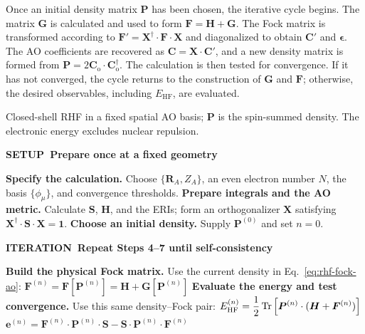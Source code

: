 \documentclass[11pt,a4paper,titlepage]{article}
\numberwithin{equation}{section}
\newcommand{\EHF}{E_\text{HF}}
\newcommand{\be}{\boldsymbol{e}}
\newcommand{\bC}{\boldsymbol{C}}
\newcommand{\bF}{\boldsymbol{F}}
\newcommand{\bG}{\boldsymbol{G}}
\newcommand{\bH}{\boldsymbol{H}}
\newcommand{\bI}{\boldsymbol{1}}
\newcommand{\bP}{\boldsymbol{P}}
\newcommand{\bR}{\boldsymbol{R}}
\newcommand{\bS}{\boldsymbol{S}}
\newcommand{\bX}{\boldsymbol{X}}
\newcommand{\beps}{\boldsymbol{\epsilon}}
\begin{document}
Once an initial density matrix $\bP$ has been chosen, the iterative
cycle begins. The matrix $\bG$ is calculated and used to form
$\bF=\bH+\bG$. The Fock matrix is transformed according to
$\bF'=\bX^\dag\cdot\bF\cdot\bX$ and diagonalized to obtain $\bC'$ and
$\beps$. The AO coefficients are recovered as
$\bC=\bX\cdot\bC'$, and a new density matrix is formed from
$\bP=2\bC_\text{o}\cdot\bC_\text{o}^\dag$. The calculation is then tested
for convergence. If it has not converged, the cycle returns to the
construction of $\bG$ and $\bF$; otherwise, the desired observables,
including $\EHF$, are evaluated.

\begin{hfscfsummary}[phantom={\label{alg:rhf-scf-summary}}]
\textcolor{hfInk}{Closed-shell RHF in a fixed spatial AO basis;
$\bP$ is the spin-summed density. The electronic energy excludes nuclear repulsion.}
\medskip
{}
\algrenewcommand{}
\begin{algorithmic}[1]
  \Statex \colorbox{hfGreenLight}{\strut\textcolor{hfGreenDark}{\bfseries
    SETUP\enspace\textbar\ Prepare once at a fixed geometry}}
  \State \textbf{Specify the calculation.}\label{algstep:scf-input}
    Choose $\{\bR_A,Z_A\}$, an even electron number $N$, the basis
    $\{\phi_\mu\}$, and convergence thresholds.
  \State \textbf{Prepare integrals and the AO metric.}\label{algstep:scf-metric}
    Calculate $\bS$, $\bH$, and the ERIs; form an orthogonalizer
    $\bX$ satisfying $\bX^\dag\cdot\bS\cdot\bX=\bI$.
  \State \textbf{Choose an initial density.}\label{algstep:scf-guess}
    Supply $\bP^{(0)}$ and set $n=0$.
  \Statex \smallskip
    \colorbox{hfBlue!7}{\strut\textcolor{hfBlue}{\bfseries
      ITERATION\enspace\textbar\ Repeat Steps 4--7 until self-consistency}}
  \State \textbf{Build the physical Fock matrix.}\label{algstep:scf-build}
    Use the current density in Eq.~\eqref{eq:rhf-fock-ao}:
  \Statex $\displaystyle
    \bF^{(n)}=\bF[\bP^{(n)}]=\bH+\bG[\bP^{(n)}]$
  \State \textbf{Evaluate the energy and test convergence.}\label{algstep:scf-test}
    Use this same density--Fock pair:
  \Statex $\displaystyle
    \EHF^{(n)}=\frac12\Tr\qty[\bP^{(n)}\cdot(\bH+\bF^{(n)})]$
  \Statex $\displaystyle
    \be^{(n)}=\bF^{(n)}\cdot\bP^{(n)}\cdot\bS
      -\bS\cdot\bP^{(n)}\cdot\bF^{(n)}$

\end{algorithmic}
\end{hfscfsummary}
\end{document}
